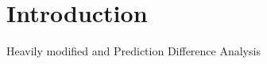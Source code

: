 \section{Introduction}
Heavily modified \cite{zeiler2014visualizing} and 
Prediction Difference Analysis \cite{zintgraf2017visualizing}

